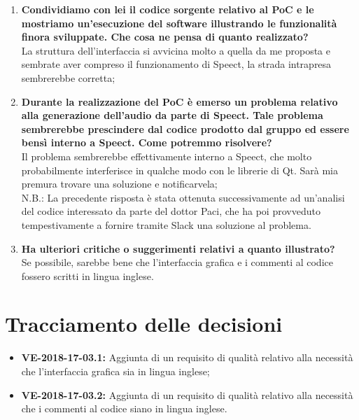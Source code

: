 \documentclass[openany,12pt,a4paper]{article}
\begin{document}
  \begin{enumerate}
  	
  	\item \textbf{Condividiamo con lei il codice sorgente relativo al PoC e le mostriamo un'esecuzione del software illustrando le funzionalità finora sviluppate. Che cosa ne pensa di quanto realizzato?} \\
  	La struttura dell'interfaccia si avvicina molto a quella da me proposta e sembrate aver compreso il funzionamento di Speect, la strada intrapresa sembrerebbe corretta;
  	
  	\item \textbf{Durante la realizzazione del PoC è emerso un problema relativo alla generazione dell'audio da parte di Speect. Tale problema sembrerebbe prescindere dal codice prodotto dal gruppo ed essere bensì interno a Speect. Come potremmo risolvere?} \\  
  	Il problema sembrerebbe effettivamente interno a Speect, che molto probabilmente interferisce in qualche modo con le librerie di Qt. Sarà mia premura trovare una soluzione e notificarvela; \\
  	
  	N.B.: La precedente risposta è stata ottenuta successivamente ad un'analisi del codice interessato da parte del dottor Paci, che ha poi provveduto tempestivamente a fornire tramite Slack una soluzione al problema.
  	
  	\item \textbf{Ha ulteriori critiche o suggerimenti relativi a quanto illustrato?} \\
  	Se possibile, sarebbe bene che l'interfaccia grafica e i commenti al codice fossero scritti in lingua inglese.
  \end{enumerate} 
 
  \section{Tracciamento delle decisioni} 
   
  \begin{itemize} 
      \item \textbf{VE-2018-17-03.1:} Aggiunta di un requisito di qualità relativo alla necessità che l'interfaccia grafica sia in lingua inglese; 
      \item \textbf{VE-2018-17-03.2:} Aggiunta di un requisito di qualità relativo alla necessità che i commenti al codice siano in lingua inglese.
  \end{itemize} 
   
  
\end{document}
